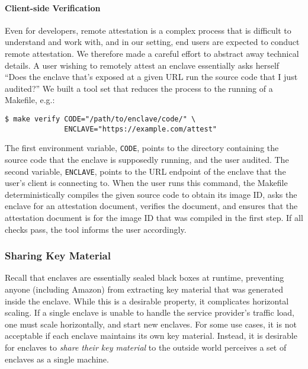 \paragraph{Client-side Verification}

Even for developers, remote attestation is a complex process that is difficult
to understand and work with, and in our setting, end users are expected to
conduct remote attestation.  We therefore made a careful effort to abstract
away technical details.  A user wishing to remotely attest an enclave
essentially asks herself ``Does the enclave that's exposed at a given URL run
the source code that I just audited?''  We built a tool set that reduces the
process to the running of a Makefile, e.g.:

\begin{lstlisting}
$ make verify CODE="/path/to/enclave/code/" \
              ENCLAVE="https://example.com/attest"
\end{lstlisting}

The first environment variable, \texttt{CODE}, points to the directory
containing the source code that the enclave is supposedly running, and the user
audited.  The second variable, \texttt{ENCLAVE}, points to the URL endpoint of
the enclave that the user's client is connecting to.  When the user runs this
command, the Makefile deterministically compiles the given source code to
obtain its image ID, asks the enclave for an attestation document, verifies the
document, and ensures that the attestation document is for the image ID that
was compiled in the first step.  If all checks pass, the tool informs the user
accordingly.

\subsubsection{Sharing Key Material}
\label{sec:sync}

Recall that enclaves are essentially sealed black boxes at runtime, preventing
anyone (including Amazon) from extracting key material that was generated
inside the enclave.  While this is a desirable property, it complicates
horizontal scaling.  If a single enclave is unable to handle the service
provider's traffic load, one must scale horizontally, and start new enclaves.
For some use cases, it is not acceptable if each enclave maintains its own key
material.  Instead, it is desirable for enclaves to \emph{share their key
material} to the outside world perceives a set of enclaves as a single machine.

